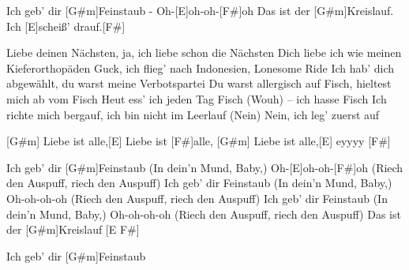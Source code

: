 \begin{guitar}
	Ich geb' dir [G#m]Feinstaub - Oh-[E]oh-oh-[F#]oh 
	Das ist der [G#m]Kreislauf. Ich [E]scheiß' drauf.[F#]{}
	
	Liebe deinen Nächsten, ja, ich liebe schon die Nächsten
	Dich liebe ich wie meinen Kieferorthopäden
	Guck, ich flieg' nach Indonesien, Lonesome Ride
	Ich hab' dich abgewählt, du warst meine Verbotspartei
	Du warst allergisch auf Fisch, hieltest mich ab vom Fisch
	Heut ess' ich jeden Tag Fisch (Wouh) – ich hasse Fisch
	Ich richte mich bergauf, ich bin nicht im Leerlauf
	(Nein) Nein, ich leg' zuerst auf
	
	[G#m] Liebe ist alle,[E] Liebe ist [F#]alle, 
	[G#m] Liebe ist alle,[E] eyyyy [F#]{}
	
	Ich geb' dir [G#m]Feinstaub (In dein'n Mund, Baby,)
	Oh-[E]oh-oh-[F#]oh (Riech den Auspuff, riech den Auspuff)
	Ich geb' dir Feinstaub (In dein'n Mund, Baby,)
	Oh-oh-oh-oh (Riech den Auspuff, riech den Auspuff)
	Ich geb' dir Feinstaub (In dein'n Mund, Baby,)
	Oh-oh-oh-oh (Riech den Auspuff, riech den Auspuff)
	Das ist der [G#m]Kreislauf [E F#]{}
	
	Ich geb' dir [G#m]Feinstaub
\end{guitar}
